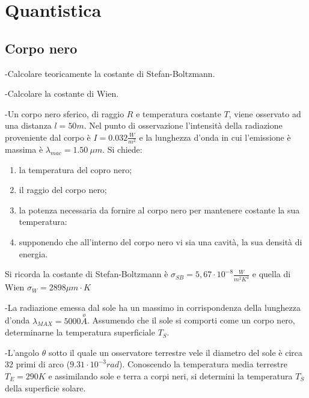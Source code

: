 \documentclass[12pt,twoside,a4]{article}
\begin{document}
\newpage
{}
\section{Quantistica}
\renewcommand{\theindexese}{$\Q$}
\setcounter{subsection}{6}
\subsection{Corpo nero}
\begin{esercizio}
	-Calcolare teoricamente la costante di Stefan-Boltzmann.
	
\end{esercizio}

\begin{esercizio}
	-Calcolare la costante di Wien.
\end{esercizio}

\begin{esercizio}
	-Un corpo nero sferico, di raggio $R$ e temperatura costante $T$, viene osservato ad una distanza $l = 50 m$. Nel punto di osservazione l'intensità  della
radiazione proveniente dal corpo  è $I = 0.032 \frac{W}{m^2}$ e la lunghezza d'onda in cui 
l'emissione è massima è $\lambda_{mac}=1.50 \ \mu m$. Si chiede:
\begin{enumerate}[label=(\textit{\roman*})]
	\item la temperatura del copro nero;
	\item il raggio del corpo nero;
	\item la potenza necessaria da fornire al corpo nero per mantenere costante la sua temperatura:
	\item supponendo che all'interno del corpo nero vi sia una cavità, la sua densità  di energia.
\end{enumerate}
Si ricorda la costante di Stefan-Boltzmann è $\sigma_{SB}=5,67 \cdot 10^{-8} \frac{W}{m^2 K^4}$ e quella di Wien  $\sigma_W =2898 \mu m\cdot K$
\end{esercizio}

\begin{esercizio}
	-La radiazione emessa dal sole ha un massimo in corrispondenza della lunghezza d'onda $\lambda_{MAX}=5000 \overset{o}{A}$. Assumendo che il sole si comporti come un corpo nero, determinarne la temperatura superficiale $T_S$.
\end{esercizio}

\newpage
\begin{esercizio}
	-L'angolo $\theta$ sotto il quale un osservatore terrestre vele il diametro del sole è circa 32 primi di arco ($9.31 \cdot 10^{-3} rad$). Conoscendo la temperatura media terrestre $T_E = 290 K$ e assimilando sole e terra a corpi neri, si determini la temperatura $T_S$ della superficie solare.
\end{esercizio}
\end{document}
